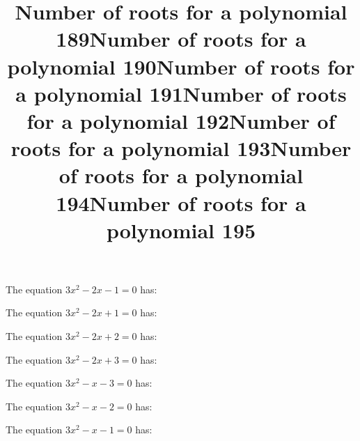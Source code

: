 \documentclass{article}
\begin{document}
\begin{category}
\begin{question}[multichoice]
\end{question}
\begin{question}[multichoice]
\title{Number of roots for a polynomial 189}
The equation $3 x^{2} - 2 x - 1=0$ has:


\end{question}
\begin{question}[multichoice]
\title{Number of roots for a polynomial 190}
The equation $3 x^{2} - 2 x + 1=0$ has:


\end{question}
\begin{question}[multichoice]
\title{Number of roots for a polynomial 191}
The equation $3 x^{2} - 2 x + 2=0$ has:


\end{question}
\begin{question}[multichoice]
\title{Number of roots for a polynomial 192}
The equation $3 x^{2} - 2 x + 3=0$ has:


\end{question}
\begin{question}[multichoice]
\title{Number of roots for a polynomial 193}
The equation $3 x^{2} - x - 3=0$ has:


\end{question}
\begin{question}[multichoice]
\title{Number of roots for a polynomial 194}
The equation $3 x^{2} - x - 2=0$ has:


\end{question}
\begin{question}[multichoice]
\title{Number of roots for a polynomial 195}
The equation $3 x^{2} - x - 1=0$ has:


\end{question}
\end{category}
\end{document}
